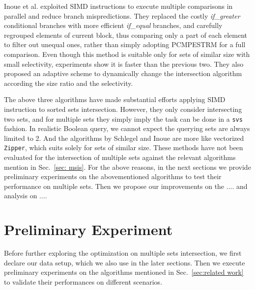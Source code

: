 \documentclass[runningheads,a4paper]{llncs}
\begin{document}
Inoue et al. \cite{Inoue2014Faster} exploited SIMD instructions to execute multiple comparisons in parallel and reduce branch mispredictions.
They replaced the costly \textit{if\_greater} conditional branches with more efficient \textit{if\_equal} branches, and carefully regrouped elements of current block, thus comparing only a part of each element to filter out unequal ones, rather than simply adopting \textsf{PCMPESTRM} for a full comparison.
Even though this method is suitable only for sets of similar size with small selectivity, experiments show it is faster than the previous two.
They also proposed an adaptive scheme to dynamically change the intersection algorithm according the size ratio and the selectivity.

The above three algorithms have made substantial efforts applying SIMD instruction to sorted sets intersection.
However, they only consider intersecting two sets, and for multiple sets they simply imply the task can be done in a \texttt{svs} fashion.
In realistic Boolean query, we cannot expect the querying sets are always limited to 2.
And the algorithms by Schlegel and Inoue are more like vectorized \texttt{Zipper}, which suits solely for sets of similar size.
These methods have not been evaluated for the intersection of multiple sets against the relevant algorithms mention in Sec.~\ref{sec: msis}.
For the above reasons, in the next sections we provide preliminary experiments on the abovementioned algorithms to test their performance on multiple sets.
Then we propose our improvements on the .... and analysis on ....
\section{Preliminary Experiment}
Before further exploring the optimization on multiple sets intersection, we first declare our data setup, which we also use in the later sections.
Then we execute preliminary experiments on the algorithms mentioned in Sec.~\ref{sec:related work} to validate their performances on different scenarios.
\end{document}
